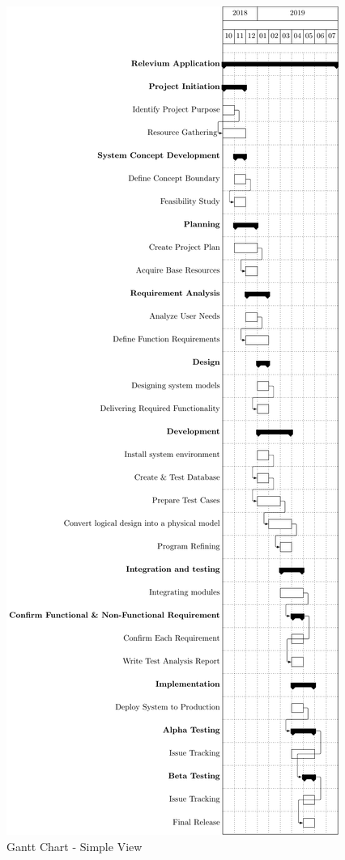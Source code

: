 \documentclass{scrreprt}
\begin{document}
\clearpage
\begin{figure}[ht!]
    \centering
    \includegraphics[height=\textheight]{gantt/gantt_month.pdf}
    \caption{Gantt Chart - Simple View}
    \label{fig:gantt1}
\end{figure}
\end{document}
